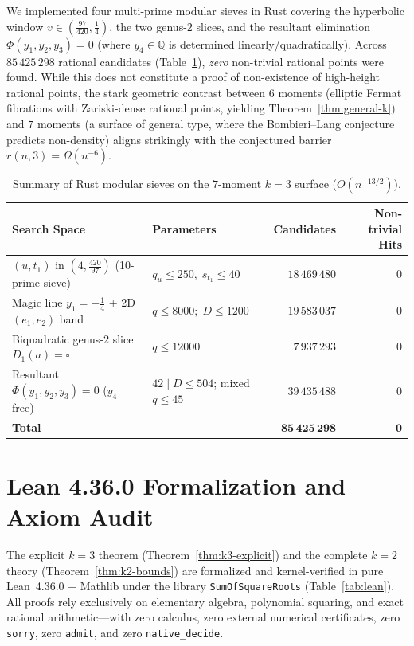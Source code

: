 \documentclass[11pt,a4paper]{article}
\theoremstyle{definition}
\theoremstyle{remark}
\newcommand{\QQ}{\mathbb{Q}}
\begin{document}
We implemented four multi-prime modular sieves in Rust covering the hyperbolic window $v \in (\frac{97}{420}, \frac{1}{4})$, the two genus-$2$ slices, and the resultant elimination $\Phi(y_1, y_2, y_3) = 0$ (where $y_4 \in \QQ$ is determined linearly/quadratically). Across $85\,425\,298$ rational candidates (Table~\ref{tab:seven-moment}), \emph{zero} non-trivial rational points were found. While this does not constitute a proof of non-existence of high-height rational points, the stark geometric contrast between $6$ moments (elliptic Fermat fibrations with Zariski-dense rational points, yielding Theorem~\ref{thm:general-k}) and $7$ moments (a surface of general type, where the Bombieri--Lang conjecture predicts non-density) aligns strikingly with the conjectured barrier $r(n, 3) = \Omega(n^{-6})$.

\begin{table}[ht]
\centering
\footnotesize
\caption{Summary of Rust modular sieves on the $7$-moment $k = 3$ surface ($O(n^{-13/2})$).}
\label{tab:seven-moment}
\begin{tabular}{@{}llrr@{}}
\toprule
Search Space & Parameters & Candidates & Non-trivial Hits \\
\midrule
$(u, t_1)$ in $(4, \frac{420}{97})$ (10-prime sieve) & $q_u \le 250,\; s_{t_1} \le 40$ & $18\,469\,480$ & $0$ \\
Magic line $y_1 = -\frac{1}{4}$ + 2D $(e_1, e_2)$ band & $q \le 8000;\; D \le 1200$ & $19\,583\,037$ & $0$ \\
Biquadratic genus-$2$ slice $D_1(a) = \square$ & $q \le 12000$ & $7\,937\,293$ & $0$ \\
Resultant $\Phi(y_1, y_2, y_3) = 0$ ($y_4$ free) & $42 \mid D \le 504$; mixed $q \le 45$ & $39\,435\,488$ & $0$ \\
\midrule
\textbf{Total} & & $\mathbf{85\,425\,298}$ & $\mathbf{0}$ \\
\bottomrule
\end{tabular}
\end{table}

\section{Lean 4.36.0 Formalization and Axiom Audit}
\label{sec:lean}

The explicit $k = 3$ theorem (Theorem~\ref{thm:k3-explicit}) and the complete $k = 2$ theory (Theorem~\ref{thm:k2-bounds}) are formalized and kernel-verified in pure Lean~4.36.0 + Mathlib under the library \texttt{SumOfSquareRoots} (Table~\ref{tab:lean}). All proofs rely exclusively on elementary algebra, polynomial squaring, and exact rational arithmetic---with zero calculus, zero external numerical certificates, zero \texttt{sorry}, zero \texttt{admit}, and zero \texttt{native\_decide}.
\end{document}
